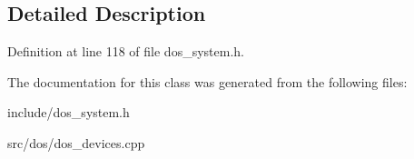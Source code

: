\subsection{Detailed Description}


Definition at line 118 of file dos\-\_\-system.\-h.



The documentation for this class was generated from the following files\-:\begin{DoxyCompactItemize}
\item 
include/dos\-\_\-system.\-h\item 
src/dos/dos\-\_\-devices.\-cpp\end{DoxyCompactItemize}
